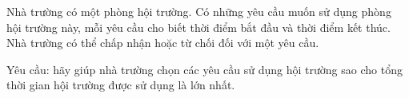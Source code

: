 Nhà trường có một phòng hội trường. Có những yêu cầu muốn sử dụng phòng hội trường này, mỗi yêu cầu cho biết thời điểm bắt đầu và thời điểm kết thúc. Nhà trường có thể chấp nhận hoặc từ chối đối với một yêu cầu.  

   Yêu cầu: hãy giúp nhà trường chọn các yêu cầu sử dụng hội trường sao cho tổng thời gian hội trường được sử dụng là lớn nhất.  

\